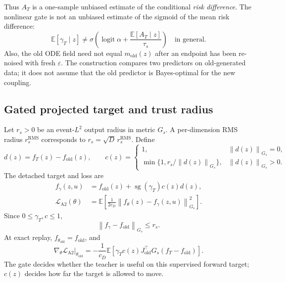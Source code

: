 \documentclass[11pt,a4paper]{article}
\newcommand{\E}{\mathbb{E}}
\newcommand{\norm}[1]{\left\lVert #1 \right\rVert}
\newcommand{\sg}{\operatorname{sg}}
\DeclareMathOperator{\logit}{logit}
\theoremstyle{plain}
\theoremstyle{definition}
\begin{document}
Thus $A_T$ is a one-sample unbiased estimate of the conditional \emph{risk difference}.  The
nonlinear gate is not an unbiased estimate of the sigmoid of the mean risk difference:
\begin{equation}
\E[\gamma_T\mid z]
\neq
\sigma\!\left(
  \logit\alpha+\frac{\E[A_T\mid z]}{\tau_s}
\right)
\quad\text{in general}.
\label{eq:a2-sigmoid-bias}
\end{equation}
Also, the old ODE field need not equal $m_{\mathrm{old}}(z)$ after an endpoint has been re-noised
with fresh $\varepsilon$.  The construction compares two predictors on old-generated data; it
does not assume that the old predictor is Bayes-optimal for the new coupling.

\subsection{Gated projected target and trust radius}

Let $r_s>0$ be an event-$L^2$ output radius in metric $G_s$.  A per-dimension RMS radius
$r_s^{\mathrm{RMS}}$ corresponds to $r_s=\sqrt D\,r_s^{\mathrm{RMS}}$.  Define
\begin{equation}
d(z)=f_T(z)-f_{\mathrm{old}}(z),
\qquad
c(z)=
\begin{cases}
1, & \norm{d(z)}_{G_s}=0,\\
\min\{1,r_s/\norm{d(z)}_{G_s}\}, & \norm{d(z)}_{G_s}>0.
\end{cases}
\label{eq:a2-projection-coef}
\end{equation}
The detached target and loss are
\begin{align}
f_\gamma(z,u)
&=
f_{\mathrm{old}}(z)
+\sg(\gamma_T)c(z)d(z),
\label{eq:a2-target}\\
\mathcal L_{\mathrm{A2}}(\theta)
&=
\E\!\left[
  \frac{1}{2c_D}
  \norm{f_\theta(z)-f_\gamma(z,u)}_{G_s}^2
\right].
\label{eq:a2-loss}
\end{align}
Since $0\le\gamma_T,c\le1$,
\begin{equation}
\norm{f_\gamma-f_{\mathrm{old}}}_{G_s}\le r_s.
\label{eq:a2-target-trust}
\end{equation}
At exact replay, $f_{\theta_{\mathrm{old}}}=f_{\mathrm{old}}$, and
\begin{equation}
\left.
\nabla_\theta\mathcal L_{\mathrm{A2}}
\right|_{\theta_{\mathrm{old}}}
=
-\frac{1}{c_D}
\E\!\left[
  \gamma_Tc(z)
  J_{\mathrm{old}}^\top G_s
  (f_T-f_{\mathrm{old}})
\right].
\label{eq:a2-local-gradient}
\end{equation}
The gate decides whether the teacher is useful on this supervised forward target; $c(z)$ decides
how far the target is allowed to move.
\end{document}
